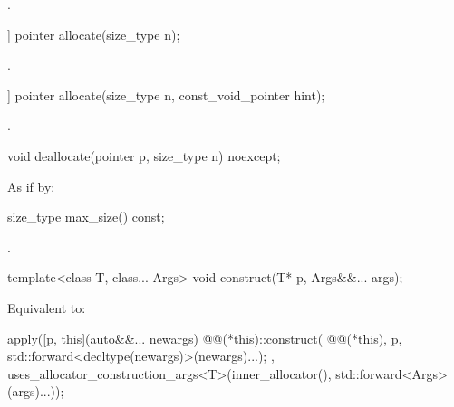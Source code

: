 \begin{itemdescr}
\pnum
\returns
{}.
\end{itemdescr}

%
\begin{itemdecl}
[[nodiscard]] pointer allocate(size_type n);
\end{itemdecl}

\begin{itemdescr}
\pnum
\returns
{}.
\end{itemdescr}

%
\begin{itemdecl}
[[nodiscard]] pointer allocate(size_type n, const_void_pointer hint);
\end{itemdecl}

\begin{itemdescr}
\pnum
\returns
{}.
\end{itemdescr}

%
\begin{itemdecl}
void deallocate(pointer p, size_type n) noexcept;
\end{itemdecl}

\begin{itemdescr}
\pnum
\effects
As if by:
\end{itemdescr}

%
\begin{itemdecl}
size_type max_size() const;
\end{itemdecl}

\begin{itemdescr}
\pnum
\returns
{}.
\end{itemdescr}

%
\begin{itemdecl}
template<class T, class... Args>
  void construct(T* p, Args&&... args);
\end{itemdecl}

\begin{itemdescr}
\pnum
\effects
Equivalent to:
\begin{codeblock}
apply([p, this](auto&&... newargs) {
        @@(*this)::construct(
          @@(*this), p,
          std::forward<decltype(newargs)>(newargs)...);
      },
      uses_allocator_construction_args<T>(inner_allocator(),
                                          std::forward<Args>(args)...));
\end{codeblock}
\end{itemdescr}


